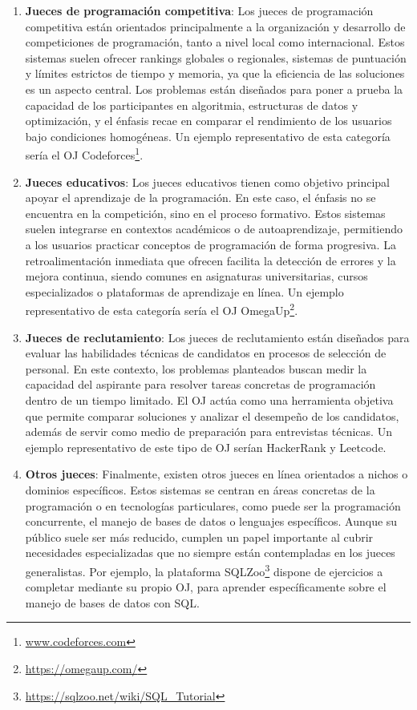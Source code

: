 \begin{enumerate}
     \item \textbf{Jueces de programación competitiva}: Los jueces de programación competitiva están orientados principalmente a la organización y desarrollo de competiciones de programación, tanto a nivel local como internacional. Estos sistemas suelen ofrecer rankings globales o regionales, sistemas de puntuación y límites estrictos de tiempo y memoria, ya que la eficiencia de las soluciones es un aspecto central. Los problemas están diseñados para poner a prueba la capacidad de los participantes en algoritmia, estructuras de datos y optimización, y el énfasis recae en comparar el rendimiento de los usuarios bajo condiciones homogéneas. Un ejemplo representativo de esta categoría sería el OJ Codeforces\footnote{\url{www.codeforces.com}}. 
     \item \textbf{Jueces educativos}: Los jueces educativos tienen como objetivo principal apoyar el aprendizaje de la programación. En este caso, el énfasis no se encuentra en la competición, sino en el proceso formativo. Estos sistemas suelen integrarse en contextos académicos o de autoaprendizaje, permitiendo a los usuarios practicar conceptos de programación de forma progresiva. La retroalimentación inmediata que ofrecen facilita la detección de errores y la mejora continua, siendo comunes en asignaturas universitarias, cursos especializados o plataformas de aprendizaje en línea. Un ejemplo representativo de esta categoría sería el OJ OmegaUp\footnote{\url{https://omegaup.com/}}. 
     \item \textbf{Jueces de reclutamiento}: Los jueces de reclutamiento están diseñados para evaluar las habilidades técnicas de candidatos en procesos de selección de personal. En este contexto, los problemas planteados buscan medir la capacidad del aspirante para resolver tareas concretas de programación dentro de un tiempo limitado. El OJ actúa como una herramienta objetiva que permite comparar soluciones y analizar el desempeño de los candidatos, además de servir como medio de preparación para entrevistas técnicas. Un ejemplo representativo de este tipo de OJ serían HackerRank y Leetcode. 
     \item \textbf{Otros jueces}: Finalmente, existen otros jueces en línea orientados a nichos o dominios específicos. Estos sistemas se centran en áreas concretas de la programación o en tecnologías particulares, como puede ser la programación concurrente, el manejo de bases de datos o lenguajes específicos. Aunque su público suele ser más reducido, cumplen un papel importante al cubrir necesidades especializadas que no siempre están contempladas en los jueces generalistas. Por ejemplo, la plataforma SQLZoo\footnote{\url{https://sqlzoo.net/wiki/SQL_Tutorial}} dispone de ejercicios a completar mediante su propio OJ, para aprender específicamente sobre el manejo de bases de datos con SQL. 
 \end{enumerate}

